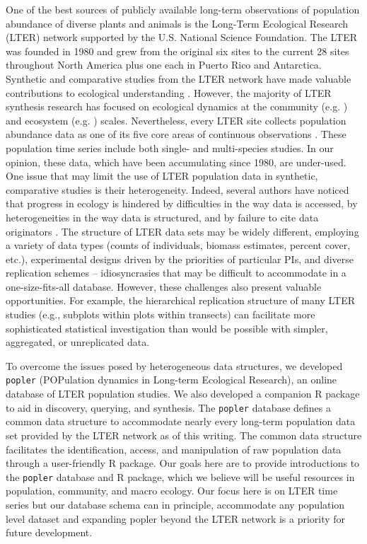 \documentclass{article}\usepackage[]{graphicx}\usepackage[]{color}
\newcommand{\tom}[1]{{\textit{\color{red}{[#1]}}}}
\begin{document}
One of the best sources of publicly available long-term observations of population abundance of diverse plants and animals is the Long-Term Ecological Research (LTER) network supported by the U.S. National Science Foundation. The LTER was founded in 1980 and grew from the original six sites to the current 28 sites throughout North America plus one each in Puerto Rico and Antarctica. Synthetic and comparative studies from the LTER network have made valuable contributions to ecological understanding \citep{Knapp2012}. However, the majority of LTER synthesis research has focused on ecological dynamics at the community (e.g. \cite{Wilcox2017}) and ecosystem (e.g. \cite{Knapp2001}) scales. Nevertheless, every LTER site collects population abundance data as one of its five core areas of continuous observations \citep{Callahan1984}. These population time series include both single- and multi-species studies. In our opinion, these data, which have been accumulating since 1980, are under-used. One issue that may limit the use of LTER population data in synthetic, comparative studies is their heterogeneity. Indeed, several authors have noticed that progress in ecology is hindered by difficulties in the way data is accessed, by heterogeneities in the way data is structured, and by failure to cite data originators \tom{Jones et al. 2004, Reichman et al. 2011}. The structure of LTER data sets may be widely different, employing a variety of data types (counts of individuals, biomass estimates, percent cover, etc.), experimental designs driven by the priorities of particular PIs, and diverse replication schemes – idiosyncrasies that may be difficult to accommodate in a one-size-fits-all database. However, these challenges also present valuable opportunities. For example, the hierarchical replication structure of many LTER studies (e.g., subplots within plots within transects) can facilitate more sophisticated statistical investigation than would be possible with simpler, aggregated, or unreplicated data. %

To overcome the issues posed by heterogeneous data structures, we developed \texttt{popler} (POPulation dynamics in Long-term Ecological Research), an online database of LTER population studies. We also developed a companion R package to aid in discovery, querying, and synthesis. The \texttt{popler} database defines a common data structure to accommodate nearly every long-term population data set provided by the LTER network as of this writing. The common data structure facilitates the identification, access, and manipulation of raw population data through a user-friendly R package. Our goals here are to provide introductions to the \texttt{popler} database and R package, which we believe will be useful resources in population, community, and macro ecology. Our focus here is on LTER time series but our database schema can in principle, accommodate any population level dataset and expanding popler beyond the LTER network is a priority for future development.
\end{document}
